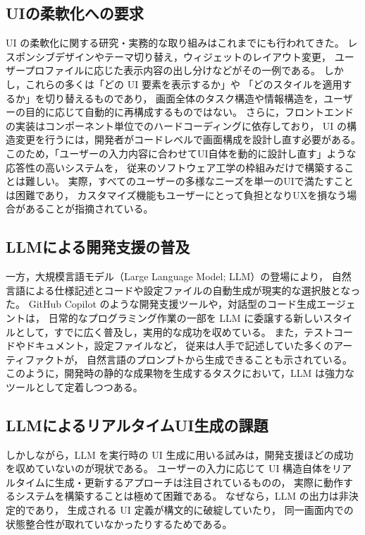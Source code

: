 \documentclass[senior,final,11pt,dvipdfmx]{iputit-thesis}
\begin{document}
\subsection{UIの柔軟化への要求}

UI の柔軟化に関する研究・実務的な取り組みはこれまでにも行われてきた。
レスポンシブデザインやテーマ切り替え，ウィジェットのレイアウト変更，
ユーザープロファイルに応じた表示内容の出し分けなどがその一例である。
しかし，これらの多くは「どの UI 要素を表示するか」や
「どのスタイルを適用するか」を切り替えるものであり，
画面全体のタスク構造や情報構造を，ユーザーの目的に応じて自動的に再構成するものではない。
さらに，フロントエンドの実装はコンポーネント単位でのハードコーディングに依存しており，
UI の構造変更を行うには，開発者がコードレベルで画面構成を設計し直す必要がある。
このため，「ユーザーの入力内容に合わせてUI自体を動的に設計し直す」ような応答性の高いシステムを，
従来のソフトウェア工学の枠組みだけで構築することは難しい。
実際，すべてのユーザーの多様なニーズを単一のUIで満たすことは困難であり\cite{grundy2022diverse}，
カスタマイズ機能もユーザーにとって負担となりUXを損なう場合があることが指摘されている\cite{nielsen2009customization,nielsen2016simplicity}。


\subsection{LLMによる開発支援の普及}

一方，大規模言語モデル（Large Language Model; LLM）の登場により，
自然言語による仕様記述とコードや設定ファイルの自動生成が現実的な選択肢となった。
GitHub Copilot のような開発支援ツール\cite{uiuc2025copilot}や，対話型のコード生成エージェントは，
日常的なプログラミング作業の一部を LLM に委譲する新しいスタイルとして，すでに広く普及し，実用的な成功を収めている。
また，テストコードやドキュメント，設定ファイルなど，
従来は人手で記述していた多くのアーティファクトが，
自然言語のプロンプトから生成できることも示されている\cite{chen2021codex,openai2023gpt4}。
このように，開発時の静的な成果物を生成するタスクにおいて，LLM は強力なツールとして定着しつつある。

\subsection{LLMによるリアルタイムUI生成の課題}

しかしながら，LLM を実行時の UI 生成に用いる試みは，開発支援ほどの成功を収めていないのが現状である。
ユーザーの入力に応じて UI 構造自体をリアルタイムに生成・更新するアプローチは注目されているものの，
実際に動作するシステムを構築することは極めて困難である。
なぜなら，LLM の出力は非決定的であり，
生成される UI 定義が構文的に破綻していたり，
同一画面内での状態整合性が取れていなかったりするためである。
\end{document}
